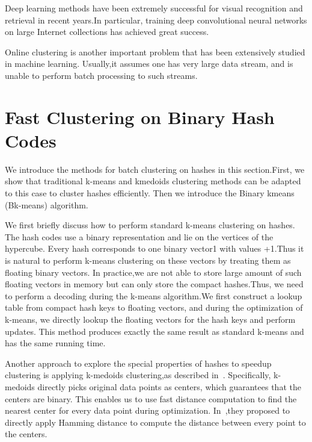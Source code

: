 \documentclass[10pt,twocolumn,letterpaper]{article}
\begin{document}
Deep learning methods have been extremely successful for visual recognition and retrieval in recent years.In particular, training deep convolutional neural networks on large Internet collections has achieved great success.

Online clustering is another important problem that has been extensively studied in machine learning. Usually,it assumes one has very large data stream, and is unable to perform batch processing to such streams.

\section{Fast Clustering on Binary Hash Codes}
We introduce the methods for batch clustering on hashes in this section.First, we show that traditional k-means and kmedoids clustering methods can be adapted to this case to cluster hashes efficiently. Then we introduce the Binary kmeans (Bk-means) algorithm.

We first briefly discuss how to perform standard k-means clustering on hashes. The hash codes use a binary representation and lie on the vertices of the hypercube. Every hash corresponds to one binary vector1 with values +1.Thus it is natural to perform k-means clustering on these vectors by treating them as floating binary vectors. In practice,we are not able to store large amount of such floating vectors in memory but can only store the compact hashes.Thus, we need to perform a decoding during the k-means algorithm.We first construct a lookup table from compact hash keys to floating vectors, and during the optimization of k-means, we directly lookup the floating vectors for the hash keys and perform updates. This method produces exactly the same result as standard k-means and has the same running time.

Another approach to explore the special properties of hashes to speedup clustering is applying k-medoids clustering,as described in~\cite{Frahm2010Building}. Specifically, k-medoids directly picks original data points as centers, which guarantees that the centers are binary. This enables us to use fast distance
computation to find the nearest center for every data point during optimization. In~\cite{Frahm2010Building},they proposed to directly apply
Hamming distance to compute the distance between every point to the centers.
{\small


}
\end{document}
